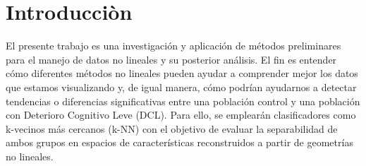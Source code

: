 \section{Introducci\`on}
El presente trabajo es una investigación y aplicación de métodos preliminares para el 
manejo de datos no lineales y su posterior análisis. El fin es entender cómo diferentes 
métodos no lineales pueden ayudar a comprender mejor los datos que estamos visualizando 
y, de igual manera, cómo podrían ayudarnos a detectar tendencias o diferencias 
significativas entre una población control y una población con Deterioro Cognitivo Leve 
(DCL). Para ello, se emplearán clasificadores como k-vecinos más cercanos (k-NN) con el 
objetivo de evaluar la separabilidad de ambos grupos en espacios de características 
reconstruidos a partir de geometrías no lineales.
